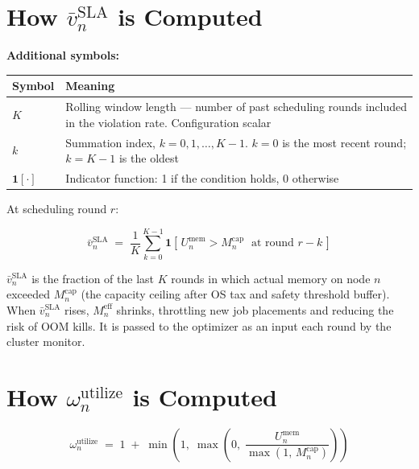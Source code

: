 \documentclass[11pt]{article}
\newcommand{\vbarsla}{\bar{v}_n^{\text{SLA}}}
\newcommand{\Meff}{M_n^{\text{eff}}}
\newcommand{\Mcap}{M_n^{\text{cap}}}
\newcommand{\omutilize}{\omega_n^{\text{utilize}}}
\newcommand{\Umem}{U_n^{\text{mem}}}
\begin{document}
\appendix

\section{How $\bar{v}_n^{\text{SLA}}$ is Computed}
\label{app:vbar}

\noindent\textbf{Additional symbols:}

\begin{center}
\begin{tabular}{@{}l p{10.5cm}@{}}
\toprule
Symbol & Meaning \\
\midrule
$K$ & Rolling window length --- number of past scheduling rounds included
  in the violation rate. Configuration scalar \\[6pt]
$k$ & Summation index, $k = 0, 1, \ldots, K{-}1$. $k=0$ is the most recent
  round; $k = K{-}1$ is the oldest \\[6pt]
$\mathbf{1}[\cdot]$ & Indicator function: 1 if the condition holds, 0
  otherwise \\
\bottomrule
\end{tabular}
\end{center}

\medskip
At scheduling round $r$:

\[
  \bar{v}_n^{\text{SLA}} \;=\;
  \frac{1}{K} \sum_{k=0}^{K-1}
    \mathbf{1}\!\left[\, \Umem > \Mcap \;\text{ at round } r - k \,\right]
\]

$\vbarsla$ is the fraction of the last $K$ rounds in which actual memory on
node $n$ exceeded $\Mcap$ (the capacity ceiling after OS tax and safety
threshold buffer). When $\vbarsla$ rises, $\Meff$ shrinks, throttling new job
placements and reducing the risk of OOM kills. It is passed to the optimizer
as an input each round by the cluster monitor.

\section{How $\omutilize$ is Computed}
\label{app:umem}

\[
  \omutilize \;=\; 1 \;+\; \min\!\left(1,\;\max\!\left(0,\;
    \frac{\Umem}{\max\!\left(1,\, \Mcap\right)}\right)\right)
\]
\end{document}
